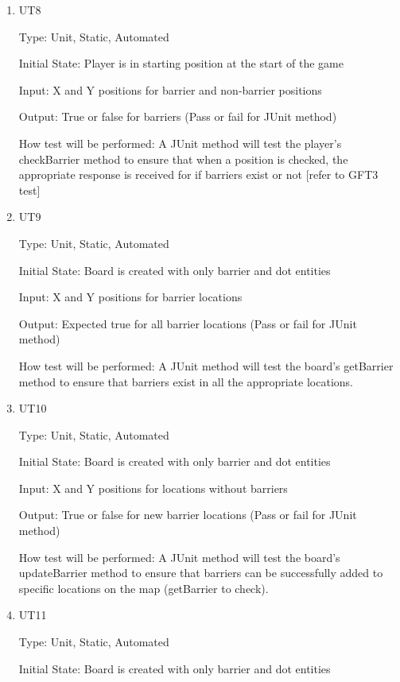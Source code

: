 \documentclass[12pt, titlepage]{article}
\begin{document}
\begin{enumerate}
\item{UT8\\}

Type: Unit, Static, Automated
					
Initial State: Player is in starting position at the start of the game
					
Input: X and Y positions for barrier and non-barrier positions
					
Output: True or false for barriers (Pass or fail for JUnit method)
					
How test will be performed: A JUnit method will test the player's checkBarrier method to ensure that when a position is checked, the appropriate response is received for if barriers exist or not [refer to GFT3 test]

\item{UT9\\}

Type: Unit, Static, Automated
					
Initial State: Board is created with only barrier and dot entities
					
Input: X and Y positions for barrier locations
					
Output: Expected true for all barrier locations (Pass or fail for JUnit method)
					
How test will be performed: A JUnit method will test the board's getBarrier method to ensure that barriers exist in all the appropriate locations.

\item{UT10\\}

Type: Unit, Static, Automated
					
Initial State: Board is created with only barrier and dot entities
					
Input: X and Y positions for locations without barriers
					
Output: True or false for new barrier locations (Pass or fail for JUnit method)
					
How test will be performed: A JUnit method will test the board's updateBarrier method to ensure that barriers can be successfully added to specific locations on the map (getBarrier to check).

\item{UT11\\}

Type: Unit, Static, Automated
					
Initial State: Board is created with only barrier and dot entities
					

\end{enumerate}
\end{document}
